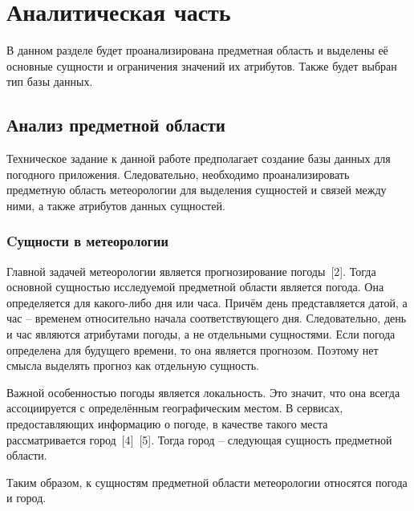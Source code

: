 \chapter{Аналитическая часть}

В данном разделе будет проанализирована предметная область и выделены её основные сущности и ограничения значений их атрибутов.
Также будет выбран тип базы данных.

\section{Анализ предметной области}

Техническое задание к данной работе предполагает создание базы данных для погодного приложения.
Следовательно, необходимо проанализировать предметную область метеорологии для выделения сущностей и связей между ними, а также атрибутов данных сущностей.

\subsection{Cущности в метеорологии}
Главной задачей метеорологии является прогнозирование погоды~[2].
Тогда основной сущностью исследуемой предметной области является погода.
Она определяется для какого-либо дня или часа.
Причём день представляется датой, а час -- временем относительно начала соответствующего дня.
Следовательно, день и час являются атрибутами погоды, а не отдельными сущностями.
Если погода определена для будущего времени, то она является прогнозом.
Поэтому нет смысла выделять прогноз как отдельную сущность.

Важной особенностью погоды является локальность.
Это значит, что она всегда ассоциируется с определённым географическим местом.
В сервисах, предоставляющих информацию о погоде, в качестве такого места рассматривается город~[4]~[5].
Тогда город -- следующая сущность предметной области.

Таким образом, к сущностям предметной области метеорологии относятся погода и город.

